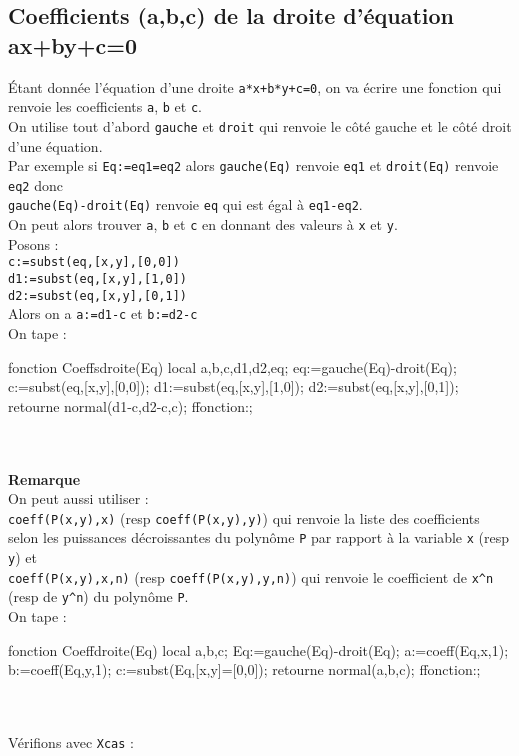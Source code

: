 \documentclass[12pt,a4paper]{book}
\begin{document}
\begin{giacjshere}
\subsection{Coefficients (a,b,c) de la droite d'\'equation ax+by+c=0}\label{sec:Coeffsdroite}
\'Etant donn\'ee l'\'equation d'une droite {\tt a*x+b*y+c=0}, on va \'ecrire une
 fonction  qui renvoie les coefficients {\tt a}, {\tt b} et {\tt c}.\\
On utilise tout d'abord {\tt gauche} et {\tt droit} qui renvoie le c\^ot\'e 
gauche et le c\^ot\'e droit d'une \'equation.\\
Par exemple si {\tt Eq:=eq1=eq2}  alors
{\tt gauche(Eq)} renvoie {\tt eq1} et
{\tt droit(Eq)} renvoie {\tt eq2} donc \\
{\tt gauche(Eq)-droit(Eq)} renvoie {\tt eq} 
qui est \'egal \`a  {\tt eq1-eq2}.\\
On peut alors trouver {\tt a}, {\tt b}  et {\tt c} en donnant des valeurs \`a
{\tt x} et {\tt y}.\\
Posons :\\
{\tt c:=subst(eq,[x,y],[0,0])}\\
{\tt d1:=subst(eq,[x,y],[1,0])}\\
{\tt d2:=subst(eq,[x,y],[0,1])}\\
Alors on a {\tt a:=d1-c} et {\tt b:=d2-c}\\
On tape :
\begin{giaconload}
fonction Coeffsdroite(Eq)
 local a,b,c,d1,d2,eq;
 eq:=gauche(Eq)-droit(Eq);
 c:=subst(eq,[x,y],[0,0]);
 d1:=subst(eq,[x,y],[1,0]);
 d2:=subst(eq,[x,y],[0,1]);
 retourne normal(d1-c,d2-c,c);
ffonction:;
\end{giaconload}
\\
\\
{\bf Remarque}\\
On peut aussi utiliser :\\
{\tt coeff(P(x,y),x)} (resp {\tt coeff(P(x,y),y)}) qui renvoie la liste 
des coefficients selon les puissances d\'ecroissantes du polyn\^ome {\tt P} par 
rapport \`a la variable {\tt x} (resp {\tt y}) et\\
{\tt coeff(P(x,y),x,n)} (resp {\tt coeff(P(x,y),y,n)}) qui renvoie le 
coefficient de {\tt x\verb|^|n} (resp de {\tt y\verb|^|n}) du
polyn\^ome {\tt P}.\\
On tape :
\begin{giacprog}
fonction Coeffdroite(Eq)
 local a,b,c;
 Eq:=gauche(Eq)-droit(Eq);
 a:=coeff(Eq,x,1);
 b:=coeff(Eq,y,1);
 c:=subst(Eq,[x,y]=[0,0]);
 retourne normal(a,b,c);
ffonction:;
\end{giacprog}
\\
\\
V\'erifions  avec {\tt Xcas} :\\


\end{giacjshere}
\end{document}
